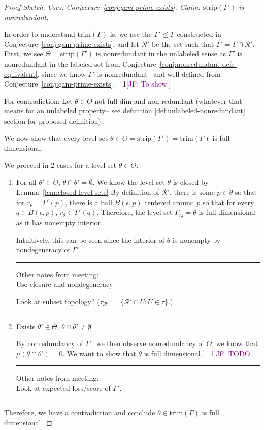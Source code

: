 \documentclass[12pt]{article}
\newcommand{\Comments}{1}
\newcommand{\mynote}[2]{\ifnum\Comments=1\textcolor{#1}{#2}\fi}
\newcommand{\jessie}[1]{\mynote{purple}{[JF: #1]}}
\newcommand{\R}{\mathcal{R}}
\newcommand{\inter}[1]{\mathring{#1}}%
\newcommand{\trim}{\mathrm{trim}}
\newcommand{\strip}{\text{strip}}
\begin{document}
\begin{proof}[Proof Sketch]
	\emph{Uses: Conjecture~\ref{conj:gam-prime-exists}.  Claim: $\strip(\Gamma')$ is nonredundant.}
	
	In order to understand $\trim(\Gamma)$ is, we use the $\Gamma' \leq \Gamma$ constructed in Conjecture~\ref{conj:gam-prime-exists}, and let $\R'$ be the set such that $\Gamma' = \Gamma\cap \R'$.
	First, we see $\Theta = \strip(\Gamma')$ is nonredundant in the unlabeled sense as $\Gamma'$ is nonredundant in the labeled set from Conjecture~\ref{conj:nonredundant-defs-equivalent}, since we know $\Gamma'$ is nonredundant-- and well-defined from Conjecture~\ref{conj:gam-prime-exists}.
	\jessie{To show.}
	
	
	
	For contradiction:
	Let $\theta \in \Theta$ not full-dim and non-redundant (whatever that means for an unlabeled property-- see definition \ref{def:unlabeled-nonredundant} section for proposed definition).
	
	We now show that every level set $\theta \in \Theta = \strip(\Gamma') = \trim(\Gamma)$ is full dimensional.
	
	We proceed in 2 cases for a level set $\theta \in \Theta$:
	\begin{enumerate}
		\item For all $\theta' \in \Theta$, $\theta \cap \theta' = \emptyset$.
		We know the level set $\theta$ is closed by Lemma~\ref{lem:closed-level-sets}
		By definition of $\R'$, there is some $p \in \inter{\theta}$ so that for $r_\theta = \Gamma'(p)$, there is a ball $B(\epsilon, p)$ centered around $p$ so that for every $q \in B(\epsilon, p)$, $r_\theta \in \Gamma'(q)$.
		Therefore, the level set $\Gamma_{r_\theta} = \theta$ is full dimensional as it has nonempty interior.
		
		Intuitively, this can be seen since the interior of $\theta$ is nonempty by nondegeneracy of $\Gamma'$.
		
		\bigskip
		\hrule
		Other notes from meeting:\\
		Use closure and nondegeneracy
		
		Look at subset topology? ($\tau_{\R'} := \{\R' \cap U : U \in \tau \}$.)
		
		\hrule
		\item Exists $\theta' \in \Theta$, $\theta \cap \theta' \neq \emptyset$.
		
		By nonredundancy of $\Gamma'$, we then observe nonredundancy of $\Theta$, we know that $\mu(\theta \cap \theta') = 0$.
		We want to show that $\theta$ is full dimensional.
		\jessie{TODO}
		
		\bigskip
		\hrule
		Other notes from meeting:\\
		Look at expected loss/score of $\Gamma'$.
		\hrule
	\end{enumerate}
	
	Therefore, we have a contradiction and conclude $\theta \in \trim(\Gamma)$ is full dimensional. 
\end{proof}
\end{document}
